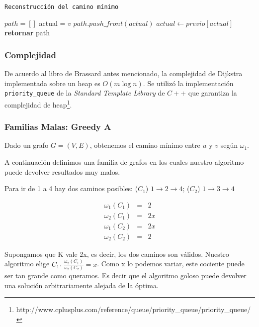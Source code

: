 \begin{algorithm}
    \caption{\texttt{Reconstrucción del camino mínimo}}
\begin{algorithmic}[1]
    \State $path = []$
    \State actual = $v$
        \State $path.push\_front(actual)$
        \State $actual \leftarrow previo[actual]$
    \EndWhile
    \State \textbf{retornar} path
\end{algorithmic}
\end{algorithm}

\newpage
\subsubsection{Complejidad}

De acuerdo al libro de Brassard antes mencionado, la complejidad de Dijkstra implementada sobre un heap es $O(m \log n)$. Se utilizó la implementación \texttt{priority\_queue} de la \textit{Standard Template Library} de $C++$ que garantiza la complejidad de heap\footnote{http://www.cplusplus.com/reference/queue/priority\_queue/priority\_queue/}. 

\clearpage
\subsubsection{Familias Malas: Greedy A}\label{subsubsec:greedy-a}
Dado un grafo $G = (V,E)$, obtenemos el camino m\'inimo entre $u$ y $v$ seg\'un $\omega_1$. 

A continuación definimos una familia de grafos en los cuales nuestro algoritmo puede devolver resultados muy malos.

Para ir de 1 a 4 hay dos caminos posibles: ($C_1$) $1 \rightarrow 2 \rightarrow 4$; ($C_2$) $1 \rightarrow 3 \rightarrow 4$

\begin{eqnarray}
 \omega_1(C_1) &=& 2 	\\ 
 \omega_2(C_1) &=& 2x	\\
 \omega_1(C_2) &=& 2x	\\
 \omega_2(C_2) &=& 2
\end{eqnarray}

Supongamos que K vale 2x, es decir, los dos caminos son válidos. Nuestro algoritmo elige $C_1$.
$\frac{\omega_2(C_1)}{\omega_2(C_2)} = x$.
Como x lo podemos variar, este cociente puede ser tan grande como queramos. Es decir que el algoritmo goloso puede devolver una solución
arbitrariamente alejada de la óptima.

